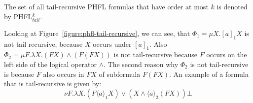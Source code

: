 The set of all tail-recursive PHFL formulas that have order at most $k$ is denoted by PHFL$^k_{tail}$.

\begin{example}{\cite{lange2014capturing}}
    Looking at Figure~\ref{figure:phfl-tail-recursive}, we can see, that $\Phi_1 = \mu X.[a]_1 X$ is not tail
    recursive, because $X$ occurs under $[a]_1$. Also $\Phi_2 = \mu F .\lambda X. (F X) \wedge (F(F X))$
    is not tail-recursive because $F$ occurs on the left side of the logical operator $\wedge$. The second reason why
    $\Phi_2$ is not tail-recursive is because $F$ also occurs in $F X$ of subformula $F (F X)$. An example of a
    formula that is tail-recursive is given by:
    \[\nu F. \lambda X. (F \langle a \rangle_1 X) \vee (X \wedge \langle a \rangle_2 (F X))\bot\]
\end{example}